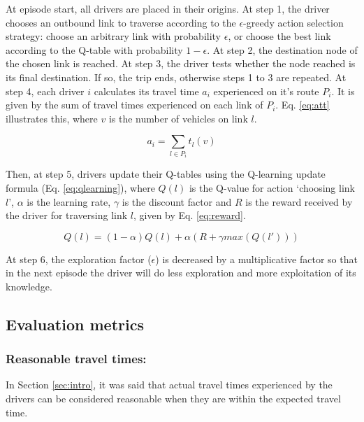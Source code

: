 \documentclass[12pt]{llncs}
\newcommand{\route}[1]{\ensuremath{P_#1}}	%
\newcommand{\travTime}{\ensuremath{t_l}} 	%
\newcommand{\veh}{\ensuremath{v}}		%
\newcommand{\att}[1]{\ensuremath{a_#1}}		%
\begin{document}
At episode start, all drivers are placed in their origins. At step 1, the driver chooses an outbound link to traverse according to the $\epsilon$-greedy action selection strategy: choose an arbitrary link with probability $\epsilon$, or choose the best link according to the Q-table with probability $1-\epsilon$. At step 2, the destination node of the chosen link is reached. At step 3, the driver tests whether the node reached is its final destination. If so, the trip ends, otherwise steps 1 to 3 are repeated. At step 4, each driver $i$ calculates its travel time $\att{i}$ experienced on it's route $\route{i}$. It is given by the sum of travel times experienced on each link of $\route{i}$. Eq. \eqref{eq:att} illustrates this, where $\veh$ is the number of vehicles on link $l$.

\begin{equation}
\label{eq:att}
\att{i} = \sum_{l \in \route{i}} \travTime(\veh)
\end{equation}

Then, at step 5, drivers update their Q-tables using the Q-learning update formula (Eq. \eqref{eq:qlearning}), where $Q(l)$ is the Q-value for action `choosing link $l$', $\alpha$ is the learning rate, $\gamma$ is the discount factor and $R$ is the reward received by the driver for traversing link $l$, given by Eq. \eqref{eq:reward}. 

\begin{equation}
\label{eq:qlearning}
Q(l) = (1 - \alpha) Q(l) + \alpha (R + \gamma max(Q(l')))
\end{equation}


 At step 6, the exploration factor ($\epsilon$) is decreased by a multiplicative factor so that in the next episode the driver will do less exploration and more exploitation of its knowledge.

\subsection{Evaluation metrics}

\subsubsection{Reasonable travel times:}
In Section \ref{sec:intro}, it was said that actual travel times experienced by the drivers can be considered reasonable when they are within the expected travel time.
\end{document}
